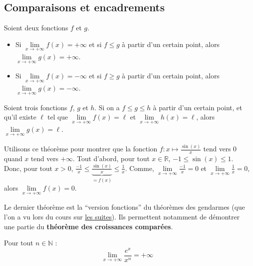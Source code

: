 	\subsection{Comparaisons et encadrements}

	\begin{formula}
		Soient deux fonctions $f$ et $g$.
		\begin{itemize}
			\item Si $\lim\limits_{x \rightarrow +\infty} f(x) = +\infty$ et si $f \leq g$ à partir d'un certain point, alors $\lim\limits_{x \rightarrow +\infty} g(x) = +\infty$.
			\item Si $\lim\limits_{x \rightarrow +\infty} f(x) = -\infty$ et si $f \geq g$ à partir d'un certain point, alors $\lim\limits_{x \rightarrow +\infty} g(x) = -\infty$.
		\end{itemize}
	\end{formula}

	\begin{formula}
		Soient trois fonctions $f$, $g$ et $h$. Si on a $f \leq g \leq h$ à partir d'un certain point, et qu'il existe $\ell$ tel que $\lim\limits_{x \rightarrow +\infty} f(x) = \ell$ et $\lim\limits_{x \rightarrow +\infty} h(x) = \ell$, alors $\lim\limits_{x \rightarrow +\infty} g(x) = \ell$.
	\end{formula}

	\begin{tip}[Exemple]
		Utilisons ce théorème pour montrer que la fonction $f : x \mapsto \frac{\sin(x)}{x}$ tend vers $0$ quand $x$ tend vers $+\infty$.
		\newpar
		Tout d'abord, pour tout $x \in \mathbb{R}$, $-1 \leq \sin(x) \leq 1$.
		\newpar
		Donc, pour tout $x > 0$, $\frac{-1}{x} \leq \underbrace{\frac{\sin(x)}{x}}_{= f(x)} \leq \frac{1}{x}$.
		\newpar
		Comme, $\lim\limits_{x \rightarrow +\infty} \frac{-1}{x} = 0$ et $\lim\limits_{x \rightarrow +\infty} \frac{1}{x} = 0$, alors $\lim\limits_{x \rightarrow +\infty} f(x) = 0$.
	\end{tip}

	Le dernier théorème est la ``version fonctions'' du théorèmes des gendarmes (que l'on a vu lors du cours sur \href{https://bacomathiqu.es/cours/terminale/suites/}{les suites}). Ils permettent notamment de démontrer une partie du \textbf{théorème des croissances comparées}.

	\begin{formula}
		Pour tout $n \in \mathbb{N}$ :
		\[ \lim\limits_{x \rightarrow +\infty} \frac{e^x}{x^n} = +\infty \]
	\end{formula}

